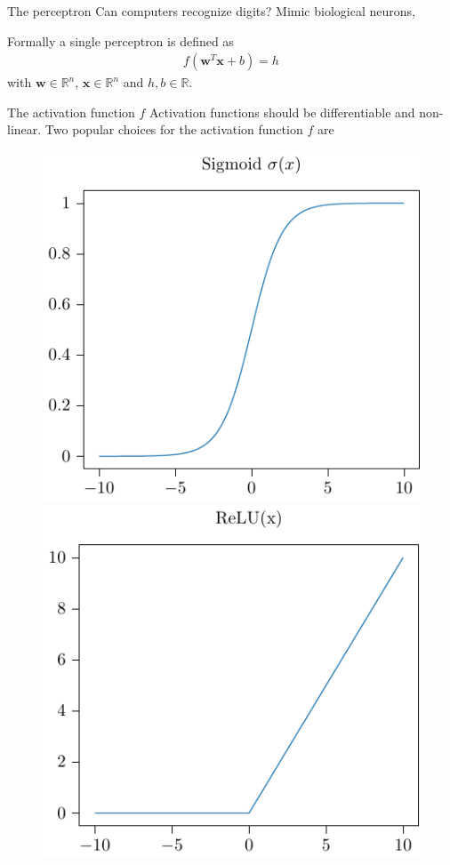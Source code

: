 \documentclass{beamer}
\begin{document}
    \begin{frame}{The perceptron}
      Can computers recognize digits? Mimic biological neurons,
      \begin{figure}
        
      \end{figure}
      Formally a single perceptron is defined as
      \begin{align}
        f(\mathbf{w}^T \mathbf{x} + b) = h
      \end{align}
      with $\mathbf{w} \in \mathbb{R}^n$, $\mathbf{x} \in \mathbb{R}^n$ and $h,b \in \mathbb{R}$. 
    \end{frame}

    \begin{frame}{The activation function $f$}
		 Activation functions should be differentiable and non-linear. Two popular choices for the activation function $f$ are
      \begin{figure}
				\includegraphics[width=0.49\linewidth]{./figures/sigmoid.pdf} 
				\includegraphics[width=0.49\linewidth]{./figures/relu.pdf} 
      \end{figure}
    \end{frame}
\end{document}
